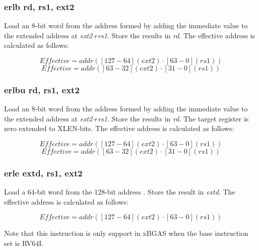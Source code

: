 \documentclass{article}
\begin{document}
\subsubsection{erlb rd, rs1, ext2}

Load an 8-bit word from the address formed by adding the immediate value to the 
extended address at \textit{ext2+rs1}.  Store the results in \textit{rd}.  
The effective address is calculated as follows: 

\begin{equation}
Effective = addr([127-64](ext2) \cdot [63-0](rs1))
\end{equation}
\begin{equation}
Effective = addr([63-32](ext2) \cdot [31-0](rs1))
\end{equation}

\subsubsection{erlbu rd, rs1, ext2}

Load an 8-bit word from the address formed by adding the immediate value to the 
extended address at \textit{ext2+rs1}.  Store the results in \textit{rd}.  
 The target register is zero extended to XLEN-bits.  The effective 
address is calculated as follows: 

\begin{equation}
Effective = addr([127-64](ext2) \cdot [63-0](rs1))
\end{equation}
\begin{equation}
Effective = addr([63-32](ext2) \cdot [31-0](rs1))
\end{equation}

\subsubsection{erle extd, rs1, ext2}

Load a 64-bit word from the 128-bit address .  Store the result in \textit{extd}.  
The effective address is calculated as follows:

\begin{equation}
Effective = addr([127-64](ext2) \cdot [63-0](rs1))
\end{equation}

\begin{commentary}
Note that this instruction is only support in xBGAS when the base 
instruction set is RV64I.
\end{commentary}
\end{document}
